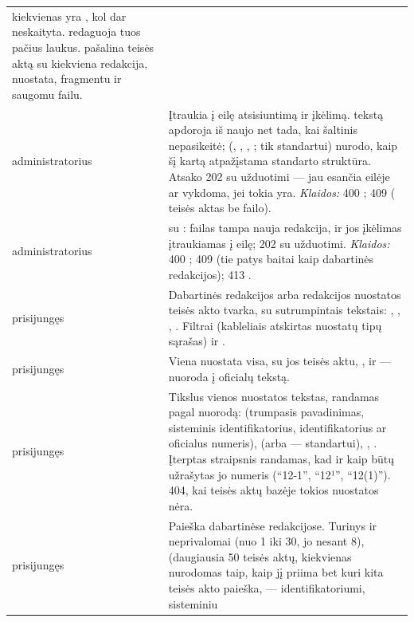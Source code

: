\begin{xltabular}{\textwidth}{@{}L{19mm}Y@{}}
  kiekvienas yra , kol dar neskaityta.  redaguoja tuos pačius laukus. 
  pašalina teisės aktą su kiekviena redakcija, nuostata, fragmentu ir saugomu failu. \\
\addlinespace
{}
administratorius & Įtraukia į eilę atsisiuntimą ir įkėlimą.  tekstą apdoroja iš naujo
  net tada, kai šaltinis nepasikeitė;  (, , ,
  ; tik standartui) nurodo, kaip šį kartą atpažįstama standarto struktūra. Atsako
  202 su užduotimi --- jau esančia eilėje ar vykdoma, jei tokia yra. \emph{Klaidos:} 400
  ; 409  ( teisės aktas be failo). \\
\addlinespace
{}
administratorius &  su : failas tampa nauja redakcija, ir jos
  įkėlimas įtraukiamas į eilę; 202 su užduotimi. \emph{Klaidos:} 400 ; 409
   (tie patys baitai kaip dabartinės redakcijos); 413 . \\
\addlinespace
{}
prisijungęs & Dabartinės redakcijos arba redakcijos  nuostatos teisės akto tvarka,
  su sutrumpintais tekstais: , , , . Filtrai
   (kableliais atskirtas nuostatų tipų sąrašas) ir . \\
\addlinespace
{}
prisijungęs & Viena nuostata visa, su jos teisės aktu, ,  ir
   --- nuoroda į oficialų tekstą. \\
\addlinespace
{}
prisijungęs & Tikslus vienos nuostatos tekstas, randamas pagal nuorodą:  (trumpasis
  pavadinimas, sisteminis identifikatorius, identifikatorius ar oficialus numeris),  (arba
   --- standartui), , . Įterptas straipsnis randamas,
  kad ir kaip būtų užrašytas jo numeris (\enquote{12-1}, \enquote{12¹}, \enquote{12(1)}). 404,
  kai teisės aktų bazėje
  tokios nuostatos nėra. \\
\addlinespace
{}
prisijungęs & Paieška dabartinėse redakcijose. Turinys  ir neprivalomai  (nuo
  1 iki 30, jo nesant 8),  (daugiausia 50 teisės aktų, kiekvienas nurodomas
  taip, kaip jį priima bet kuri kita teisės akto paieška, --- identifikatoriumi, sisteminiu

\end{xltabular}
